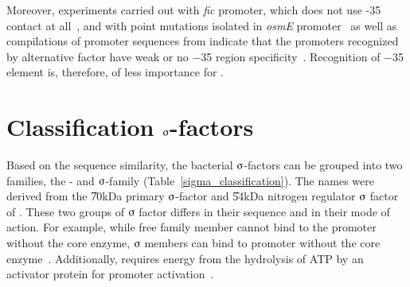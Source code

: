 Moreover, experiments carried out with \emph{fic} promoter, which
does not use -35 contact at all~\citep{Tanaka1995}, and with point
mutations isolated in \emph{osmE} promoter~\citep{Bordes2000} as
well as compilations of promoter sequences from 
\citep{Espinosa1996} indicate that the promoters recognized by
alternative \s{} factor \sigs{} have weak or no $-$35 region
specificity~\citep{Becker2001}. Recognition of $-$35 element is,
therefore, of less importance for \sigs{}.

\section{Classification $\sigmaup$-factors}
 \label{sig_class} Based on the sequence
similarity, the bacterial $\sigmaup$-factors can be grouped into
two families, the \siga{}- and $\sigmaup$-family
(Table~\ref{sigma_classification}). The names were derived from
the \U{70}{kDa} primary $\sigmaup$-factor and \U{54}{kDa} nitrogen
regulator $\sigmaup$ factor of . These two groups of
$\sigmaup$ factor differs in their sequence and in their mode of
action. For example, while free \siga{} family member cannot bind
to the promoter without the core enzyme, $\sigmaup$ members
can bind to promoter without the core enzyme~\citep{Ishihama1993}.
Additionally, \s{} requires energy from the hydrolysis of ATP
by an activator protein for promoter
activation~\citep{Merrick1993}.



